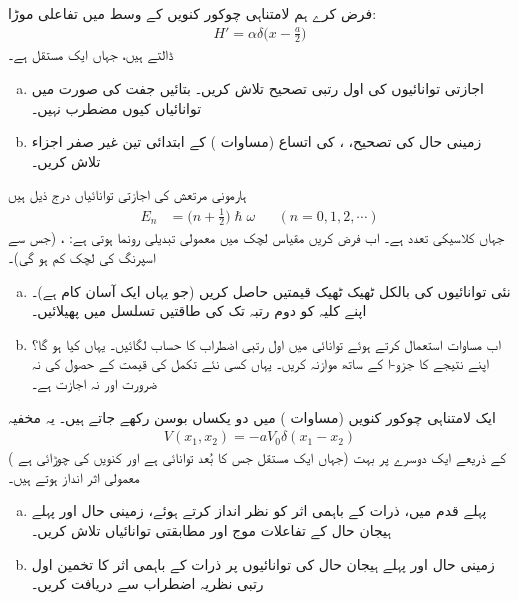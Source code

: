  
فرض کرے ہم لامتناہی چوکور کنویں کے وسط میں  تفاعلی موڑا:
\begin{align*}
H' = \alpha \delta \big(x - \frac{a}{2}\big)
\end{align*}
 ڈالتے ہیں، جہاں  ایک مستقل ہے۔ 
\begin{enumerate}[a.]
\item
 اجازتی توانائیوں کی اول رتبی تصحیح تلاش کریں۔ بتائیں جفت  کی صورت میں توانائیاں کیوں مضطرب نہیں۔
\item
 زمینی حال کی تصحیح، ، کی اتساع (مساوات ) کے ابتدائی تین غیر صفر اجزاء تلاش کریں۔
 \end{enumerate}
ہارمونی مرتعش  کی اجازتی توانائیاں درج ذیل ہیں 
\begin{align*}
E_n &= \big(n + \frac{1}{2}\big) \hslash \omega && (n = 0, 1, 2, \cdots )
\end{align*}
جہاں  کلاسیکی تعدد ہے۔ اب فرض کریں مقیاس لچک میں معمولی تبدیلی رونما ہوتی ہے: ، (جس سے اسپرنگ کی لچک کم ہو گی)۔
\begin{enumerate}[a.]
\item
 نئی توانائیوں کی بالکل ٹھیک ٹھیک قیمتیں حاصل کریں (جو یہاں ایک آسان کام ہے)۔ اپنے کلیہ کو دوم رتبہ تک  کی طاقتیں تسلسل میں پھیلائیں۔ 
\item
 اب مساوات  استعمال کرتے ہوئے توانائی میں اول رتبی اضطراب کا حساب لگائیں۔ یہاں  کیا ہو گا؟ اپنے نتیجے کا جزو-ا کے ساتھ موازنہ کریں۔  یہاں کسی نئے تکمل کی قیمت کے حصول کی نہ ضرورت اور نہ اجازت ہے۔
 \end{enumerate}
ایک لامتناہی چوکور کنویں (مساوات ) میں دو یکساں بوسن رکھے جاتے ہیں۔ یہ مخفیہ 
\begin{align*}
V(x_1, x_2) = -aV_0\delta (x_1 - x_2)
\end{align*}
( جہاں  ایک مستقل جس کا بُعد توانائی ہے اور  کنویں کی چوڑائی ہے) کے ذریعے ایک دوسرے پر بہت معمولی اثر انداز ہوتے ہیں۔
\begin{enumerate}[a.]
\item
 پہلے قدم میں، ذرات کے باہمی اثر کو نظر انداز کرتے ہوئے، زمینی حال اور پہلے ہیجان حال کے تفاعلات موج اور مطابقتی توانائیاں تلاش کریں۔
\item
 زمینی حال اور پہلے ہیجان حال کی توانائیوں پر ذرات کے باہمی اثر کا تخمین اول رتبی نظریہ اضطراب سے دریافت کریں۔
 \end{enumerate}


